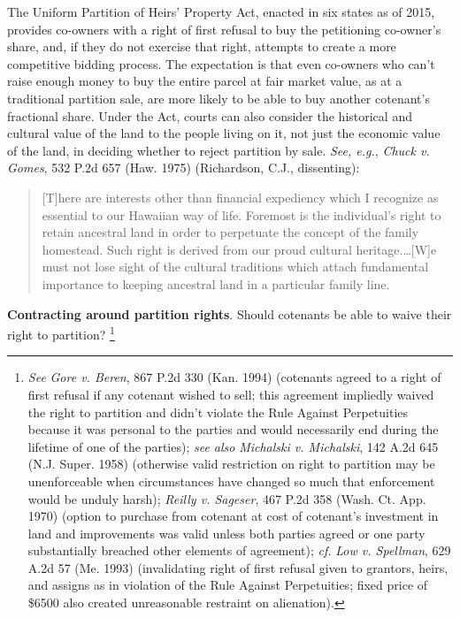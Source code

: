 The Uniform Partition of Heirs' Property Act, enacted in six states as of 2015,
provides co-owners with a right of first refusal to buy the petitioning
co-owner's share, and, if they do not exercise that right, attempts to create a
more competitive bidding process. The expectation is that even co-owners who
can't raise enough money to buy the entire parcel at fair market value, as at a
traditional partition sale, are more likely to be able to buy another
cotenant's fractional share. Under the Act, courts can also consider the
historical and cultural value of the land to the people living on it, not just
the economic value of the land, in deciding whether to reject partition by
sale. \emph{See, e.g.}, \emph{Chuck v. Gomes}, 532 P.2d 657 (Haw. 1975)
(Richardson, C.J., dissenting):
\begin{quote}
[T]here are interests other than financial expediency which I recognize as
essential to our Hawaiian way of life. Foremost is the individual's right to
retain ancestral land in order to perpetuate the concept of the family
homestead. Such right is derived from our proud cultural heritage.\ldots [W]e
must not lose sight of the cultural traditions which attach fundamental
importance to keeping ancestral land in a particular family line.
\end{quote}

\item \textbf{Contracting around partition rights}. Should cotenants be able to
waive their right to partition? \footnote{\textit{See} \emph{Gore v. Beren}, 867
P.2d 330
(Kan. 1994) (cotenants agreed to a right of first refusal if any cotenant wished
to sell; this agreement impliedly waived the right to partition and didn't
violate the Rule Against Perpetuities because it was personal to the parties and
would necessarily end during the lifetime of one of the parties); \textit{see
also} \emph{Michalski v. Michalski}, 142 A.2d 645 (N.J. Super. 1958) (otherwise
valid restriction on right to partition may be unenforceable when circumstances
have changed so much that enforcement would be unduly harsh); \emph{Reilly v.
Sageser}, 467 P.2d 358 (Wash. Ct. App. 1970) (option to purchase from cotenant
at cost of cotenant's investment in land and improvements was valid unless both
parties agreed or one party substantially breached other elements of agreement);
\textit{cf.} \emph{Low v. Spellman}, 629 A.2d 57 (Me. 1993) (invalidating right
of first refusal given to grantors, heirs, and assigns as in violation of the
Rule Against Perpetuities; fixed price of \$6500 also created unreasonable
restraint on alienation).}


